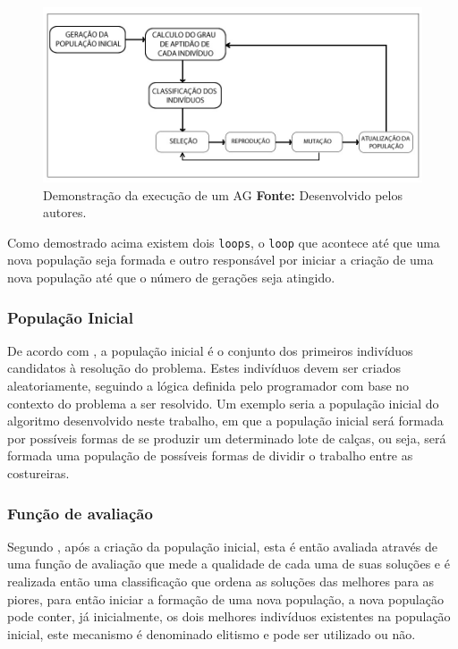\begin{figure}[h!]
	\centerline{\includegraphics[scale=0.6]{./imagens/algoritimos_geneticos.jpg}}
	\caption[Demonstração da execução de um AG]
	{Demonstração da execução de um AG \textbf{Fonte:} Desenvolvido pelos autores.}
	\label{fig:representacao_ags}
\end{figure}

\par Como demostrado acima existem dois \texttt{loops}, o
\texttt{loop} que acontece até que uma nova população seja formada e outro
responsável por  iniciar a criação de uma nova população até que o
número de gerações seja atingido.

\subsubsection{População Inicial}

\par De acordo com , a população inicial 
é o conjunto dos primeiros indivíduos candidatos à resolução do problema. Estes
indivíduos devem ser criados aleatoriamente, seguindo a lógica definida pelo programador com base no contexto do 
problema a ser resolvido. Um exemplo seria a população inicial do algoritmo desenvolvido neste trabalho, 
em que a população inicial será formada por possíveis formas de se produzir um determinado lote de calças, 
ou seja, será formada uma população de possíveis formas de dividir o trabalho entre as costureiras.

\subsubsection{Função de avaliação}

\par Segundo , após a criação da população
inicial, esta é então avaliada através de uma função de avaliação que mede a
qualidade de cada uma de suas soluções e é realizada então uma classificação que ordena as soluções das melhores para as
piores, para então iniciar a formação de uma nova população, a nova população
pode conter, já inicialmente, os dois melhores indivíduos existentes na
população inicial, este mecanismo é denominado elitismo e pode ser utilizado ou
não.

